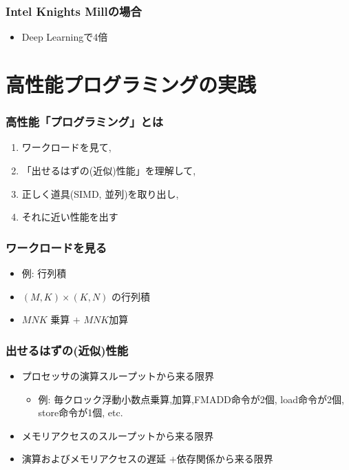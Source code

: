 \documentclass[10pt,dvipdfmx]{beamer}
\begin{document}
\begin{frame}
  \frametitle{Intel Knights Millの場合}
  \begin{itemize}
  \item Deep Learningで4倍
  \end{itemize}
\end{frame}
\fi

\iffalse
\section{高性能プログラミングの実践}

\begin{frame}
  \frametitle{高性能「プログラミング」とは}
  \begin{enumerate}
  \item<1-> ワークロードを見て, 
  \item<2-> 「出せるはずの(近似)性能」を理解して, 
  \item<3-> 正しく道具(SIMD, 並列)を取り出し, 
  \item<4-> それに近い性能を出す
  \end{enumerate}
\end{frame}

\begin{frame}
  \frametitle{ワークロードを見る}
  \begin{itemize}
  \item 例: 行列積
  \item $(M,K) \times (K,N)$ の行列積
  \item $MNK$ 乗算 $+$ $MNK$加算
  \end{itemize}
\end{frame}

  
\begin{frame}
  \frametitle{出せるはずの(近似)性能}
  \begin{itemize}
  \item プロセッサの演算スループットから来る限界
    \begin{itemize}
    \item 例: 毎クロック浮動小数点乗算,加算,FMADD命令が2個, load命令が2個, store命令が1個, etc.
    \end{itemize}
  \item メモリアクセスのスループットから来る限界
  \item 演算およびメモリアクセスの遅延
    $+$依存関係から来る限界
  \end{itemize}
\end{frame}
\end{document}
